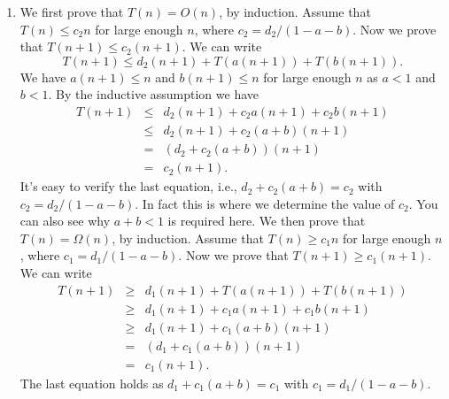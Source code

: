 \begin{enumerate}
\item
We first prove that $T(n) = O(n)$, by induction.
Assume that $T(n) \le c_2n$ for large enough $n$, where $c_2 = d_2/(1-a-b)$.
Now we prove that $T(n + 1) \le c_2(n+1)$.
We can write
$$T(n + 1) \le d_2(n+1) + T(a(n+1)) + T(b(n+1)).$$
We have $a(n+1) \le n$ and $b(n+1) \le n$ for large enough $n$ as $a < 1$ and $b < 1$.
By the inductive assumption we have
\begin{eqnarray*}
T(n + 1) & \le & d_2(n+1) + c_2a(n+1) + c_2b(n+1) \\
	      & \le & d_2(n+1) + c_2(a+b)(n+1) \\
	      & =   & (d_2 + c_2(a+b))(n+1) \\
		  & =   & c_2(n+1).
\end{eqnarray*}
It's easy to verify the last equation, i.e., $d_2 + c_2(a+b) = c_2$ with $c_2 = d_2 / (1 - a - b)$.
In fact this is where we determine the value of $c_2$. You can also see why
$a + b < 1$ is required here.
We then prove that $T(n) = \Omega(n)$, by induction.
Assume that $T(n) \ge c_1n$ for large enough $n$, where $c_1 = d_1/(1-a-b)$.
Now we prove that $T(n + 1) \ge c_1(n+1)$.
We can write
\begin{eqnarray*}
T(n + 1) &\ge & d_1(n+1) + T(a(n+1)) + T(b(n+1)) \\
          & \ge & d_1(n+1) + c_1a(n+1) + c_1b(n+1) \\
	      & \ge & d_1(n+1) + c_1(a+b)(n+1) \\
	      & =   & (d_1 + c_1(a+b))(n+1) \\
		  & =   & c_1(n+1).
\end{eqnarray*}
The last equation holds as $d_1 + c_1(a+b) = c_1$ with $c_1 = d_1 / (1 - a - b)$.


\end{enumerate}
